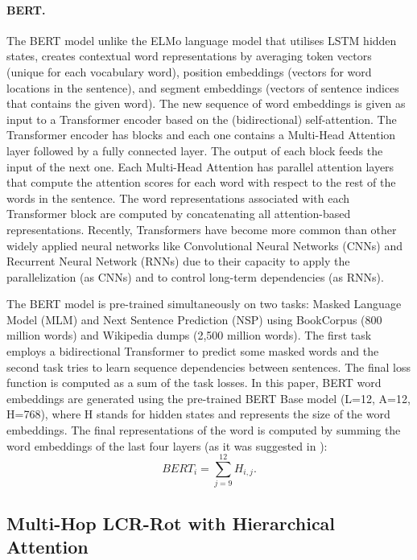 \documentclass[hidelinks]{llncs}
\begin{document}
\paragraph{BERT. }The BERT model unlike the ELMo language model that utilises LSTM hidden states, creates contextual word representations by averaging token vectors (unique for each vocabulary word), position embeddings (vectors for word locations in the sentence), and segment embeddings (vectors of sentence indices that contains the given word). The new sequence of word embeddings is given as input to a Transformer encoder \cite{vaswani2017attention} based on the (bidirectional) self-attention. 
The Transformer encoder has  blocks and each one contains a Multi-Head Attention layer followed by a fully connected layer. The output of each block feeds the input of the next one. Each Multi-Head Attention has  parallel attention layers that compute the attention scores for each word with respect to the rest of the words in the sentence. The word representations associated with each Transformer block are computed by concatenating all attention-based representations. Recently, Transformers have become more common than other widely applied neural networks like Convolutional Neural Networks (CNNs) and Recurrent Neural Network (RNNs) due to their capacity to apply the parallelization (as CNNs) and to control long-term dependencies (as RNNs). 

The BERT model is pre-trained simultaneously on two tasks: Masked Language Model (MLM) and Next Sentence Prediction (NSP) using BookCorpus (800 million words) and Wikipedia dumps (2,500 million words). The first task employs a bidirectional Transformer to predict some masked words and the second task tries to learn sequence dependencies between sentences. The final loss function is computed as a sum of the task losses. In this paper, BERT word embeddings are generated using the pre-trained BERT Base model (L=12, A=12, H=768), where H stands for hidden states and represents the size of the word embeddings. The final representations of the word  is computed by summing the word embeddings of the last four layers (as it was suggested in \cite{devlin2018bert}):
\begin {equation}
\label{equation10}
BERT_i = \sum_{j = 9}^{12}H_{i, j}.
\end {equation}

\subsection{Multi-Hop LCR-Rot with Hierarchical Attention}\label{Hierarchical}
\end{document}
